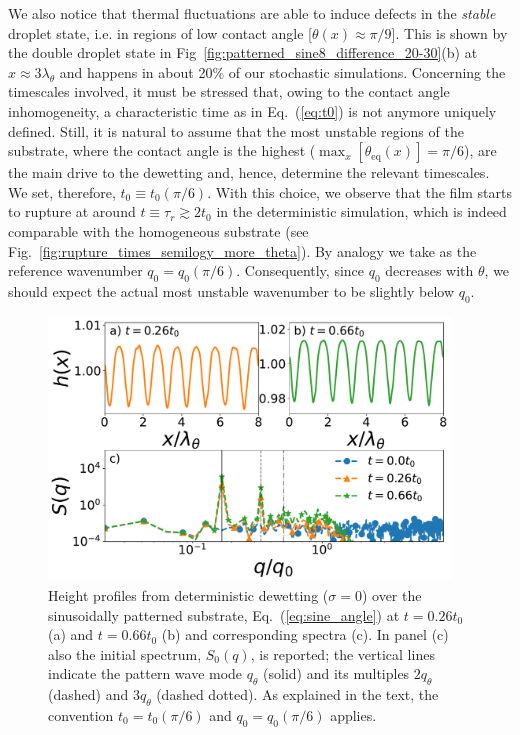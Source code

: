 We also notice that thermal fluctuations are able to induce defects in the \textit{stable} droplet state, i.e. in regions of low contact angle [$\theta(x) \approx \pi/9$]. 
This is shown by the double droplet state in Fig~\ref{fig:patterned_sine8_difference_20-30}(b) at $x \approx 3 \lambda_{\theta}$ and happens in about 20\% of our stochastic simulations.
Concerning the timescales involved, it must be stressed that, owing to the contact angle inhomogeneity, a characteristic time as in Eq.~(\ref{eq:t0}) is not anymore uniquely defined. 
Still, it is natural to assume that the most unstable regions of the substrate, where the contact angle is the highest ($\max_x[\theta_{\text{eq}}(x)] = \pi/6$), are the main drive to the dewetting and, hence, determine the relevant timescales. 
We set, therefore, $t_0 \equiv t_0(\pi/6)$. 
With this choice, we observe that the film starts to rupture at around $t \equiv \tau_r \gtrsim 2 t_0$ in the deterministic simulation, which is indeed comparable with the homogeneous substrate (see Fig.~\ref{fig:rupture_times_semilogy_more_theta}). 
By analogy we take as the reference wavenumber $q_0 = q_0(\pi/6)$. 
Consequently, since $q_0$ decreases with $\theta$, we should expect the actual most unstable wavenumber to be slightly below $q_0$.
\begin{figure}
    \centering
    \includegraphics[width=0.95\textwidth]{graphics/psd_spacedepCA_sine_25_10_00_[0, 450000, 1150000]_9_3_rescaled.pdf}
    \caption{Height profiles from deterministic dewetting ($\sigma=0$) over the sinusoidally patterned substrate, Eq.~(\ref{eq:sine_angle}) at $t=0.26 t_0$ (a) and $t=0.66 t_0$ (b) and corresponding spectra (c).  
    In panel (c) also the initial spectrum, $S_0(q)$, is reported; the vertical lines indicate the pattern wave mode $q_{\theta}$ (solid) and its multiples $2q_{\theta}$ (dashed) and $3q_{\theta}$ (dashed dotted).
    As explained in the text, the convention $t_0 = t_0(\pi/6)$ and $q_0 = q_0(\pi/6)$ applies.}   
    \label{fig:spectral_analysis_deter_sine8}
\end{figure}
